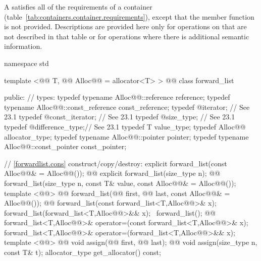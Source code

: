 \documentclass[american,twoside]{book}
\begin{document}
\pnum
A  satisfies all of the requirements of a container (table~\ref{tab:containers.container.requirements}), except that the  member function is not provided. Descriptions are provided here only for operations on  that are not described in that table or for operations where there is additional semantic information.

\begin{codeblock}
namespace std { 
  template <@@ T, @@ Alloc@@ = allocator<T> > 
  @@
  class forward_list { 
  public: 
    // types: 
    typedef typename Alloc@@::reference reference; 
    typedef typename Alloc@@::const_reference const_reference; 
    typedef @\impdef@ iterator;       // See 23.1 
    typedef @\impdef@ const_iterator; // See 23.1 
    typedef @\impdef@ size_type;      // See 23.1 
    typedef @\impdef@ difference_type;// See 23.1 
    typedef T value_type; 
    typedef Alloc@@ allocator_type; 
    typedef typename Alloc@@::pointer pointer; 
    typedef typename Alloc@@::const_pointer const_pointer; 

    // \ref{forwardlist.cons} construct/copy/destroy: 
    explicit forward_list(const Alloc@@& = Alloc@@()); 
    @@ explicit forward_list(size_type n);
    @@ 
      forward_list(size_type n, const T& value, 
                   const Alloc@@& = Alloc@@()); 
    template <@@>
      @@
      forward_list(@@ first, @@ last, 
                   const Alloc@@& = Alloc@@()); 
    @@ 
      forward_list(const forward_list<T,Alloc@@>& x);
    forward_list(forward_list<T,Alloc@@>&& x);
    ~forward_list(); 
    @@ 
      forward_list<T,Alloc@@>& operator=(const forward_list<T,Alloc@@>& x);
    forward_list<T,Alloc@@>& operator=(forward_list<T,Alloc@@>&& x); 
    template <@@> 
      @@
      void assign(@@ first, @@ last); 
    @@ void assign(size_type n, const T& t); 
    allocator_type get_allocator() const; 

}}
\end{codeblock}
\end{document}
